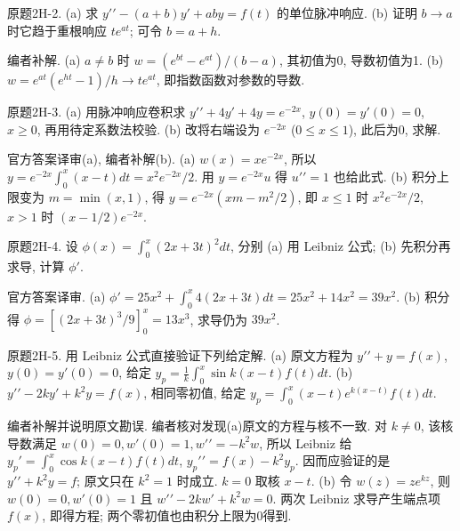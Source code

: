 \begin{exercise}\label{cw:bank-2H-2}
原题2H-2. (a) 求 $y\prime\prime-(a+b)y\prime+aby=f(t)$ 的单位脉冲响应. (b) 证明 $b\to a$ 时它趋于重根响应 $te^{at}$; 可令 $b=a+h$.
\end{exercise}
\begin{solution}
编者补解. (a) $a\ne b$ 时 $w=(e^{bt}-e^{at})/(b-a)$, 其初值为0, 导数初值为1. (b) $w=e^{at}(e^{ht}-1)/h\to te^{at}$, 即指数函数对参数的导数.
\end{solution}
\begin{exercise}\label{cw:bank-2H-3}
原题2H-3. (a) 用脉冲响应卷积求 $y\prime\prime+4y\prime+4y=e^{-2x}$, $y(0)=y\prime(0)=0$, $x\ge0$, 再用待定系数法校验. (b) 改将右端设为 $e^{-2x}$ ($0\le x\le1$), 此后为0, 求解.
\end{exercise}
\begin{solution}
官方答案译审(a), 编者补解(b). (a) $w(x)=xe^{-2x}$, 所以 $y=e^{-2x}\int_0^x(x-t)dt=x^2e^{-2x}/2$. 用 $y=e^{-2x}u$ 得 $u\prime\prime=1$ 也给此式. (b) 积分上限变为 $m=\min(x,1)$, 得 $y=e^{-2x}(xm-m^2/2)$, 即 $x\le1$ 时 $x^2e^{-2x}/2$, $x>1$ 时 $(x-1/2)e^{-2x}$.
\end{solution}
\begin{exercise}\label{cw:bank-2H-4}
原题2H-4. 设 $\phi(x)=\int_0^x(2x+3t)^2dt$, 分别 (a) 用 Leibniz 公式; (b) 先积分再求导, 计算 $\phi\prime$.
\end{exercise}
\begin{solution}
官方答案译审. (a) $\phi\prime=25x^2+\int_0^x4(2x+3t)dt=25x^2+14x^2=39x^2$. (b) 积分得 $\phi=[(2x+3t)^3/9]_0^x=13x^3$, 求导仍为 $39x^2$.
\end{solution}
\begin{exercise}\label{cw:bank-2H-5}
原题2H-5. 用 Leibniz 公式直接验证下列给定解. (a) 原文方程为 $y\prime\prime+y=f(x)$, $y(0)=y\prime(0)=0$, 给定 $y_p=\frac1k\int_0^x\sin k(x-t)f(t)dt$. (b) $y\prime\prime-2ky\prime+k^2y=f(x)$, 相同零初值, 给定 $y_p=\int_0^x(x-t)e^{k(x-t)}f(t)dt$.
\end{exercise}
\begin{solution}
编者补解并说明原文勘误. 编者核对发现(a)原文的方程与核不一致. 对 $k\ne0$, 该核导数满足 $w(0)=0,w\prime(0)=1,w\prime\prime=-k^2w$, 所以 Leibniz 给 $y_p\prime=\int_0^x\cos k(x-t)f(t)dt$, $y_p\prime\prime=f(x)-k^2y_p$. 因而应验证的是 $y\prime\prime+k^2y=f$; 原文只在 $k^2=1$ 时成立. $k=0$ 取核 $x-t$. (b) 令 $w(z)=ze^{kz}$, 则 $w(0)=0,w\prime(0)=1$ 且 $w\prime\prime-2kw\prime+k^2w=0$. 两次 Leibniz 求导产生端点项 $f(x)$, 即得方程; 两个零初值也由积分上限为0得到.
\end{solution}
